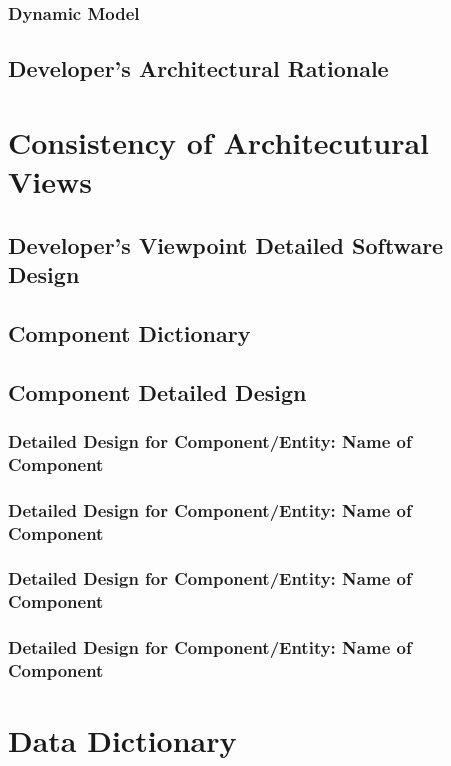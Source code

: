 			\subsubsection{Dynamic Model}
		 \subsection{Developer's Architectural Rationale}
	\section{Consistency of Architecutural Views}
		\subsection{Developer's Viewpoint Detailed Software Design}
		\subsection{Component Dictionary}
		\subsection{Component Detailed Design}
			\subsubsection{Detailed Design for Component/Entity: Name of Component}
			\subsubsection{Detailed Design for Component/Entity: Name of Component}
			\subsubsection{Detailed Design for Component/Entity: Name of Component}
			\subsubsection{Detailed Design for Component/Entity: Name of Component}
	\section{Data Dictionary}

